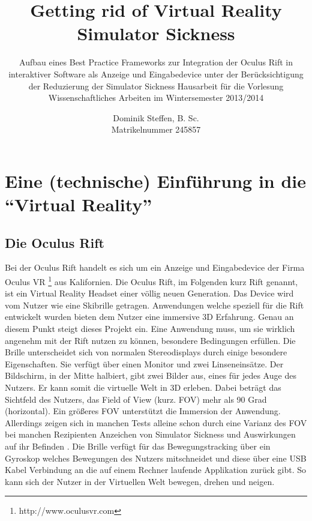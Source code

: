 \documentclass[pagesize, paper=a4, fontsize=12pt,titlepage=true, headings=small, headnosepline, abstractoff, liststotoc, nochapterprefix, plainheadsepline]{scrreprt}
\author{
Dominik Steffen, B. Sc.
\\
Matrikelnummer 245857
}
\title{Getting rid of Virtual Reality Simulator Sickness}
\subtitle{Aufbau eines Best Practice Frameworks zur Integration der Oculus Rift in interaktiver Software als Anzeige und Eingabedevice unter der Berücksichtigung der Reduzierung der Simulator Sickness\newline
Hausarbeit für die Vorlesung Wissenschaftliches Arbeiten im Wintersemester 2013/2014
}
\begin{document}
\maketitle
%


\begingroup
	\tableofcontents
	\thispagestyle{empty}
\endgroup


\renewcommand*{\chapterpagestyle}{plain}
\pagestyle{plain}
\setcounter{page}{0}

\chapter{Eine (technische) Einführung in die "`Virtual Reality"'}

\section{Die Oculus Rift}
Bei der Oculus Rift handelt es sich um ein Anzeige und Eingabedevice der Firma Oculus VR \footnote{http://www.oculusvr.com} aus Kalifornien. Die Oculus Rift, im Folgenden kurz Rift genannt, ist ein Virtual Reality Headset einer völlig neuen Generation. Das Device wird vom Nutzer wie eine Skibrille getragen. Anwendungen welche speziell für die Rift entwickelt wurden bieten dem Nutzer eine immersive 3D Erfahrung. Genau an diesem Punkt steigt dieses Projekt ein. Eine Anwendung muss, um sie wirklich angenehm mit der Rift nutzen zu können, besondere Bedingungen erfüllen. Die Brille unterscheidet sich von normalen Stereodisplays durch einige besondere Eigenschaften. Sie verfügt über einen Monitor und zwei Linseneinsätze. Der Bildschirm, in der Mitte halbiert, gibt zwei Bilder aus, eines für jedes Auge des Nutzers. Er kann somit die virtuelle Welt in 3D erleben. Dabei beträgt das Sichtfeld des Nutzers, das Field of View (kurz. FOV) mehr als 90 Grad (horizontal). Ein größeres FOV unterstützt die Immersion der Anwendung. Allerdings zeigen sich in manchen Tests alleine schon durch eine Varianz des FOV bei manchen Rezipienten Anzeichen von Simulator Sickness und Auswirkungen auf ihr Befinden \cite{SeayKrumHodgesRibarsky2001}. Die Brille verfügt für das Bewegungstracking über ein Gyroskop welches Bewegungen des Nutzers mitschneidet und diese über eine USB Kabel Verbindung an die auf einem Rechner laufende Applikation zurück gibt. So kann sich der Nutzer in der Virtuellen Welt bewegen, drehen und neigen.
\end{document}
